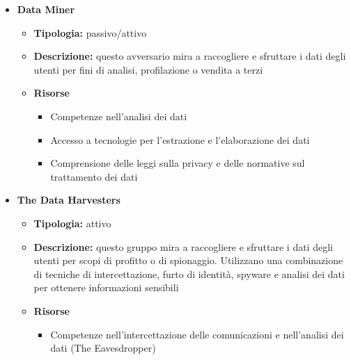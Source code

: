 \begin{itemize}
            \item \textbf{Data Miner}
                \begin{itemize}
                    \item \textbf{Tipologia:} passivo/attivo
    
                    \item \textbf{Descrizione:} questo avversario mira a raccogliere e sfruttare i dati degli utenti per fini di analisi, profilazione o vendita a terzi
    
                    \item \textbf{Risorse}
                        \begin{itemize}
                            \item Competenze nell'analisi dei dati
                            
                            \vspace{3mm}
    
                            \item Accesso a tecnologie per l'estrazione e l'elaborazione dei dati
    
                            \vspace{3mm}
    
                            \item Comprensione delle leggi sulla privacy e delle normative sul trattamento dei dati
                        \end{itemize}
                \end{itemize}
    
            \item \textbf{The Data Harvesters}
                \begin{itemize}
                    \item \textbf{Tipologia:} attivo
    
                    \item \textbf{Descrizione:} questo gruppo mira a raccogliere e sfruttare i dati degli utenti per scopi di profitto o di spionaggio.
                    Utilizzano una combinazione di tecniche di intercettazione, furto di identità, spyware e analisi dei dati per ottenere informazioni sensibili
    
                    \item \textbf{Risorse}
                        \begin{itemize}
                            \item Competenze nell'intercettazione delle comunicazioni e nell'analisi dei dati (The Eavesdropper)
                            

\end{itemize}
\end{itemize}
\end{itemize}
